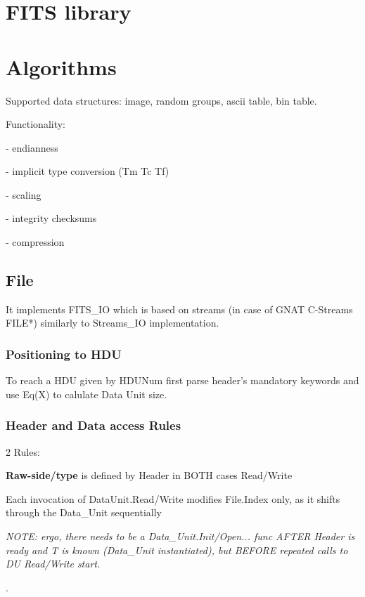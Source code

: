 \documentclass[a4paper,10pt]{article}
\begin{document}
\tableofcontents

\section{FITS library}


\section{Algorithms}

Supported data structures: image, random groups, ascii table, bin table.

Functionality:

- endianness

- implicit type conversion (Tm Tc Tf)

- scaling

- integrity checksums

- compression



\subsection{File}
It implements FITS\_IO which is based on streams (in case of GNAT C-Streams FILE*) similarly to Streams\_IO implementation.



\subsubsection{Positioning to HDU}

To reach a HDU given by HDUNum first parse header's mandatory keywords and use Eq(X)
to calulate Data Unit size. 


\subsubsection{Header and Data access Rules}

2 Rules:

\textbf{Raw-side/type} is defined by Header in BOTH cases Read/Write

Each invocation of DataUnit.Read/Write modifies File.Index only, as it shifts through the Data\_Unit sequentially

\textit{NOTE: ergo, there needs to be a Data\_Unit.Init/Open... func AFTER Header is ready and T is known (Data\_Unit instantiated), but BEFORE repeated calls to DU Read/Write start.}

.
\end{document}
